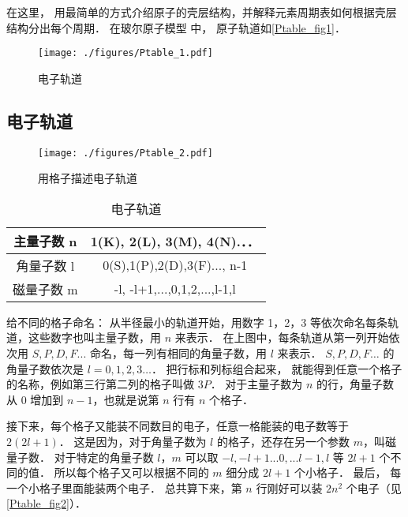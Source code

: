 
\begin{issues}
\issueTODO
\end{issues}

在这里， 用最简单的方式介绍原子的壳层结构，并解释元素周期表如何根据壳层结构分出每个周期． 在玻尔原子模型 中， 原子轨道如\autoref{Ptable_fig1}．

\begin{figure}[ht]
\centering
\texttt{[image: ./figures/Ptable\_1.pdf]}
\caption{电子轨道}\label{Ptable_fig1}
\end{figure}

\subsection{电子轨道}
\begin{figure}[ht]
\centering
\texttt{[image: ./figures/Ptable\_2.pdf]}
\caption{用格子描述电子轨道} 
\end{figure}

\begin{table}[ht]
\centering
\caption{电子轨道}\label{Ptable_tab1}
\begin{tabular}{|c|c|}
\hline
主量子数 n& 1(K), 2(L), 3(M), 4(N).．． \\
\hline
角量子数 l& 0(S),1(P),2(D),3(F)..., n-1 \\
\hline
磁量子数 m & -l, -l+1,...,0,1,2,...,l-1,l \\
\hline
\end{tabular}
\end{table}

给不同的格子命名： 从半径最小的轨道开始，用数字 1，2，3 等依次命名每条轨道，这些数字也叫主量子数，用 $n$ 来表示． 在上图中，每条轨道从第一列开始依次用 $S,P,D,F...$ 命名，每一列有相同的角量子数，用 $l$ 来表示．  $S,P,D,F\dots$ 的角量子数依次是 $l = 0,1,2,3\dots$． 把行标和列标组合起来， 就能得到任意一个格子的名称，例如第三行第二列的格子叫做 $3P$． 对于主量子数为 $n$ 的行，角量子数从 0 增加到 $n-1$，也就是说第 $n$ 行有 $n$ 个格子．

接下来，每个格子又能装不同数目的电子，任意一格能装的电子数等于 $2(2l + 1)$． 这是因为，对于角量子数为 $l$ 的格子，还存在另一个参数 $m$，叫磁量子数． 对于特定的角量子数 $l$，$m$ 可以取 $ - l, - l + 1...0,...l - 1,l$ 等 $2l + 1$ 个不同的值． 所以每个格子又可以根据不同的 $m$ 细分成 $2l+1$ 个小格子． 最后， 每一个小格子里面能装两个电子． 总共算下来，第 $n$ 行刚好可以装 $2n^2$ 个电子（见\autoref{Ptable_fig2}）．

